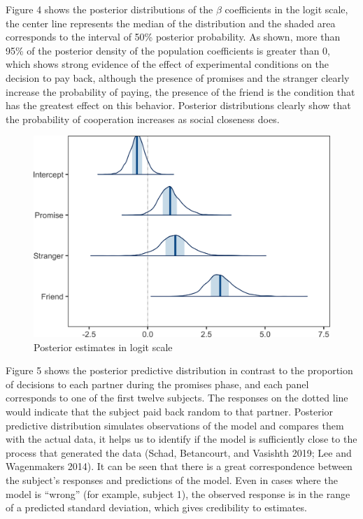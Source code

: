 \documentclass[smallextended]{svjour3}       %
\begin{document}
Figure 4 shows the posterior distributions of the \(\beta\) coefficients
in the logit scale, the center line represents the median of the
distribution and the shaded area corresponds to the interval of 50\%
posterior probability. As shown, more than 95\% of the posterior density
of the population coefficients is greater than 0, which shows strong
evidence of the effect of experimental conditions on the decision to pay
back, although the presence of promises and the stranger clearly
increase the probability of paying, the presence of the friend is the
condition that has the greatest effect on this behavior. Posterior
distributions clearly show that the probability of cooperation increases
as social closeness does.

\begin{figure}

{\centering \includegraphics[width=0.8\linewidth]{behavioral-promises_files/figure-latex/fig4-1} 

}

\caption{Posterior estimates in logit scale}\label{fig:fig4}
\end{figure}

Figure 5 shows the posterior predictive distribution in contrast to the
proportion of decisions to each partner during the promises phase, and
each panel corresponds to one of the first twelve subjects. The
responses on the dotted line would indicate that the subject paid back
random to that partner. Posterior predictive distribution simulates
observations of the model and compares them with the actual data, it
helps us to identify if the model is sufficiently close to the process
that generated the data (Schad, Betancourt, and Vasishth 2019; Lee and
Wagenmakers 2014). It can be seen that there is a great correspondence
between the subject's responses and predictions of the model. Even in
cases where the model is ``wrong'' (for example, subject 1), the
observed response is in the range of a predicted standard deviation,
which gives credibility to estimates.
\end{document}
